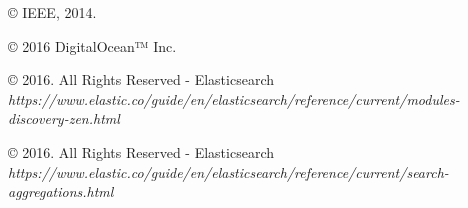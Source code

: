 
\label{app:bibliography} %



\begin{thebibliography}{Bibliography}
© IEEE, 2014.

© 2016 DigitalOcean™ Inc.


© 2016. All Rights Reserved - Elasticsearch	\textit{https://www.elastic.co/guide/en/elasticsearch/reference/current/modules-discovery-zen.html}

© 2016. All Rights Reserved - Elasticsearch
\textit{https://www.elastic.co/guide/en/elasticsearch/reference/current/search-aggregations.html}
\end{thebibliography}

